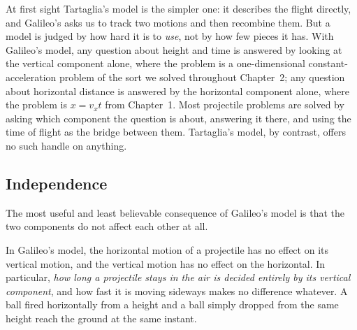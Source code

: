 \documentclass[11pt,twoside,openany]{book}
\begin{document}
\begin{modelnote}
At first sight Tartaglia's model is the simpler one: it describes the flight directly, and Galileo's asks us to track two motions and then recombine them. But a model is judged by how hard it is to \emph{use}, not by how few pieces it has. With Galileo's model, any question about height and time is answered by looking at the vertical component alone, where the problem is a one-dimensional constant-acceleration problem of the sort we solved throughout Chapter~2; any question about horizontal distance is answered by the horizontal component alone, where the problem is $x = v_x t$ from Chapter~1. Most projectile problems are solved by asking which component the question is about, answering it there, and using the time of flight as the bridge between them. Tartaglia's model, by contrast, offers no such handle on anything.
\end{modelnote}

\subsection{Independence}
\label{sec:independence}

The most useful and least believable consequence of Galileo's model is that the two components do not affect each other at all.

\begin{keyidea}
In Galileo's model, the horizontal motion of a projectile has no effect on its vertical motion, and the vertical motion has no effect on the horizontal. In particular, \emph{how long a projectile stays in the air is decided entirely by its vertical component}, and how fast it is moving sideways makes no difference whatever. A ball fired horizontally from a height and a ball simply dropped from the same height reach the ground at the same instant.
\end{keyidea}
\end{document}
